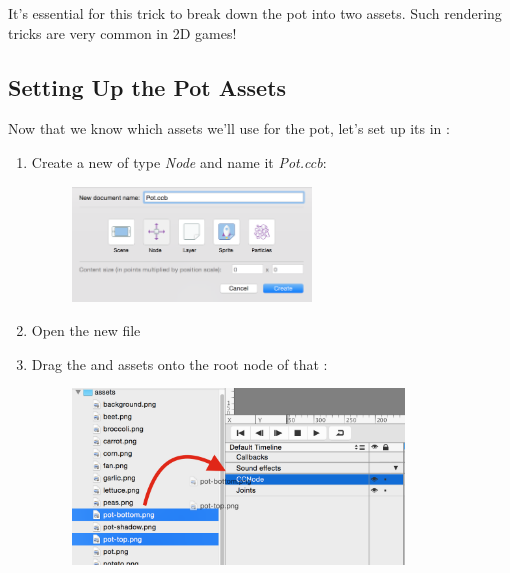 It's essential for this trick to break down the pot into two assets. Such
rendering tricks are very common in 2D games!

\subsection{Setting Up the Pot Assets}
Now that we know which assets we'll use for the pot, let's set up
its \ccbfile{} in \SB{}:
\begin{leftbar}
\begin{enumerate}
  \item Create a new \ccbfile{} of type \textit{Node} and name it
  \textit{Pot.ccb}: \begin{figure}[H]
    \centering
    \includegraphics[width=180pt]{images/Chapter3/ccp_pot_file.png}
  \end{figure}
  \item Open the new  file
  \item Drag the  and  assets onto
  the root node of that \ccbfile{}: \begin{figure}[H]
    \centering
    \includegraphics[width=250pt]{images/Chapter3/drag_pot_assets.png}
  \end{figure}
  

\end{enumerate}
\end{leftbar}
